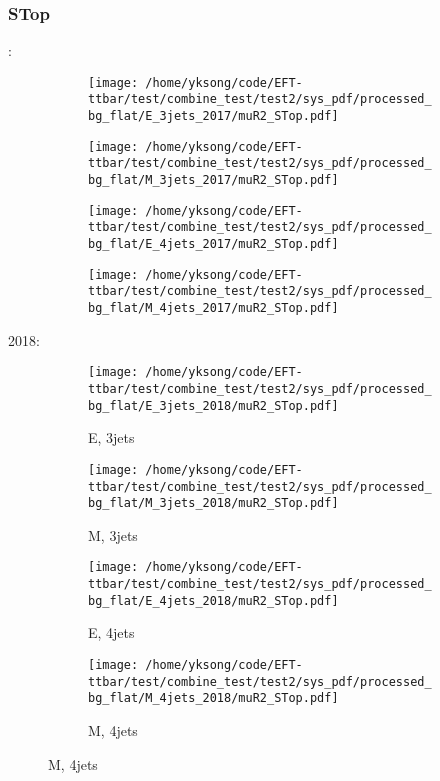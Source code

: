\documentclass{beamer}
\begin{document}
\begin{frame}
\frametitle{STop}
\fontsize{5}{1}:
\begin{figure}
\centering
\begin{subfigure}[b]{0.24\textwidth}
\texttt{[image: /home/yksong/code/EFT-ttbar/test/combine\_test/test2/sys\_pdf/processed\_bg\_flat/E\_3jets\_2017/muR2\_STop.pdf]}
\end{subfigure}
\begin{subfigure}[b]{0.24\textwidth}
\texttt{[image: /home/yksong/code/EFT-ttbar/test/combine\_test/test2/sys\_pdf/processed\_bg\_flat/M\_3jets\_2017/muR2\_STop.pdf]}
\end{subfigure}
\begin{subfigure}[b]{0.24\textwidth}
\texttt{[image: /home/yksong/code/EFT-ttbar/test/combine\_test/test2/sys\_pdf/processed\_bg\_flat/E\_4jets\_2017/muR2\_STop.pdf]}
\end{subfigure}
\begin{subfigure}[b]{0.24\textwidth}
\texttt{[image: /home/yksong/code/EFT-ttbar/test/combine\_test/test2/sys\_pdf/processed\_bg\_flat/M\_4jets\_2017/muR2\_STop.pdf]}
\end{subfigure}
\end{figure}
2018:
\begin{figure}
\centering
\begin{subfigure}[b]{0.24\textwidth}
\texttt{[image: /home/yksong/code/EFT-ttbar/test/combine\_test/test2/sys\_pdf/processed\_bg\_flat/E\_3jets\_2018/muR2\_STop.pdf]}
\captionsetup{font=tiny}
\caption{E, 3jets}
\end{subfigure}
\begin{subfigure}[b]{0.24\textwidth}
\texttt{[image: /home/yksong/code/EFT-ttbar/test/combine\_test/test2/sys\_pdf/processed\_bg\_flat/M\_3jets\_2018/muR2\_STop.pdf]}
\captionsetup{font=tiny}
\caption{M, 3jets}
\end{subfigure}
\begin{subfigure}[b]{0.24\textwidth}
\texttt{[image: /home/yksong/code/EFT-ttbar/test/combine\_test/test2/sys\_pdf/processed\_bg\_flat/E\_4jets\_2018/muR2\_STop.pdf]}
\captionsetup{font=tiny}
\caption{E, 4jets}
\end{subfigure}
\begin{subfigure}[b]{0.24\textwidth}
\texttt{[image: /home/yksong/code/EFT-ttbar/test/combine\_test/test2/sys\_pdf/processed\_bg\_flat/M\_4jets\_2018/muR2\_STop.pdf]}
\captionsetup{font=tiny}
\caption{M, 4jets}
\end{subfigure}
\end{figure}
\end{frame}
\end{document}
